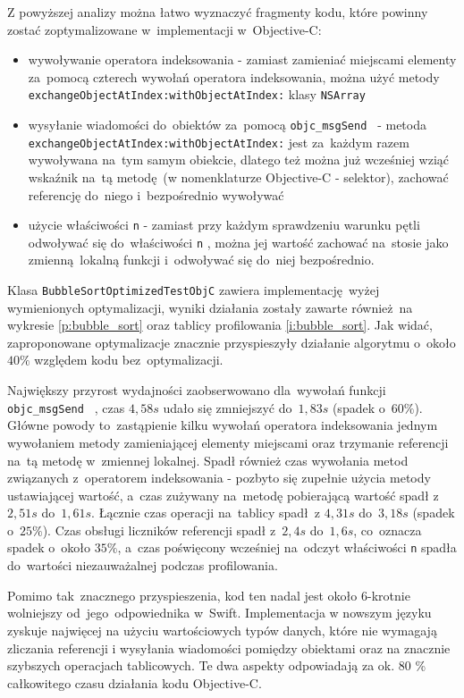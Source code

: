 \documentclass[mgr, shortabstract]{iithesis}
\newcommand{\objcinline}[1]{
    \texttt{#1}
}
\begin{document}
Z powyższej analizy można łatwo wyznaczyć fragmenty kodu, które powinny zostać zoptymalizowane w~implementacji w~Objective-C:

\begin{itemize}
    \item wywoływanie operatora indeksowania - zamiast zamieniać miejscami elementy za~pomocą czterech wywołań operatora indeksowania, można użyć metody \objcinline{exchangeObjectAtIndex:withObjectAtIndex:} klasy \objcinline{NSArray}
    \item wysyłanie wiadomości do~obiektów za~pomocą \objcinline{objc_msgSend } - metoda \objcinline{exchangeObjectAtIndex:withObjectAtIndex:} jest za~każdym razem wywoływana na~tym samym obiekcie, dlatego też można już wcześniej wziąć wskaźnik na~tą metodę (w nomenklaturze Objective-C - selektor), zachować referencję do~niego i~bezpośrednio wywoływać
    \item użycie właściwości \objcinline{n} - zamiast przy każdym sprawdzeniu warunku pętli odwoływać się do~właściwości \objcinline{n}, można jej wartość zachować na~stosie jako zmienną lokalną funkcji i~odwoływać się do~niej bezpośrednio.
\end{itemize}

Klasa \objcinline{BubbleSortOptimizedTestObjC} zawiera implementację wyżej wymienionych optymalizacji, wyniki działania zostały zawarte również na wykresie \ref{p:bubble_sort} oraz tablicy profilowania \ref{i:bubble_sort}. Jak widać, zaproponowane optymalizacje znacznie przyspieszyły działanie algorytmu o~około $40\%$ względem kodu bez~optymalizacji.

Największy przyrost wydajności zaobserwowano dla~wywołań funkcji \objcinline{objc_msgSend }, czas $4,58s$ udało się zmniejszyć do~$1,83s$ (spadek o~$60\%$). Główne powody to~zastąpienie kilku wywołań operatora indeksowania jednym wywołaniem metody zamieniającej elementy miejscami oraz trzymanie referencji na~tą metodę w~zmiennej lokalnej. Spadł również czas wywołania metod związanych z~operatorem indeksowania - pozbyto się zupełnie użycia metody ustawiającej wartość, a~czas zużywany na~metodę pobierającą wartość spadł z~$2,51s$ do~$1,61s$. Łącznie czas operacji na~tablicy spadł z $4,31s$ do~$3,18s$ (spadek o~$25\%$). Czas obsługi liczników referencji spadł z~$2,4s$ do~$1,6s$, co~oznacza spadek o~około $35\%$, a~czas poświęcony wcześniej na~odczyt właściwości \objcinline{n} spadła do~wartości niezauważalnej podczas profilowania.

Pomimo tak~znacznego przyspieszenia, kod ten nadal jest około 6-krotnie wolniejszy od~jego~odpowiednika w~Swift. Implementacja w nowszym języku zyskuje najwięcej na użyciu wartościowych typów danych, które nie wymagają zliczania referencji i wysyłania wiadomości pomiędzy obiektami oraz na znacznie szybszych operacjach tablicowych. Te dwa aspekty odpowiadają za ok. 80 \% całkowitego czasu działania kodu Objective-C.
\end{document}
